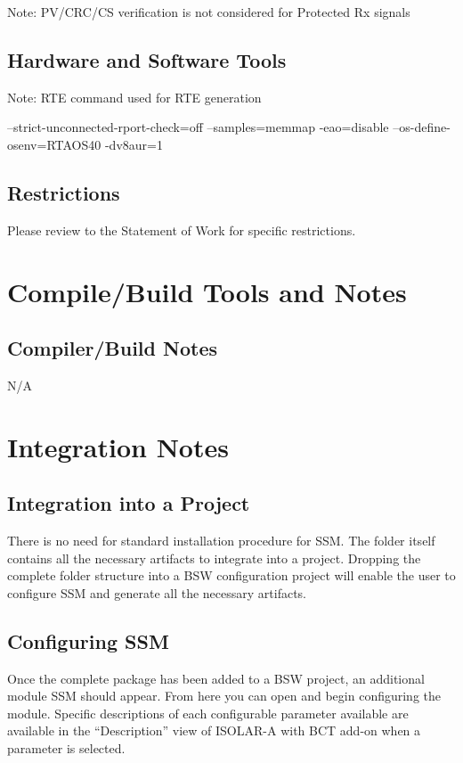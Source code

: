 

Note: PV/CRC/CS verification is not considered for Protected Rx signals

\subsection{Hardware and Software Tools}


Note: RTE command used for RTE generation

\begin{rtecommandline}
--strict-unconnected-rport-check=off --samples=memmap -eao=disable --os-define-osenv=RTAOS40 -dv8aur=1
\end{rtecommandline}

\subsection{Restrictions}
Please review to the Statement of Work for specific restrictions.

\section{Compile/Build Tools and Notes}

\subsection{Compiler/Build Notes}
N/A

\section{Integration Notes}

\subsection{Integration into a Project}
There is no need for standard installation procedure for SSM.
The folder itself contains all the necessary artifacts to integrate into a project.
Dropping the complete folder structure into a BSW configuration project will enable the user to configure SSM and generate all the necessary artifacts.

\subsection{Configuring SSM}
Once the complete package has been added to a BSW project, an additional module SSM should appear.
From here you can open and begin configuring the module.
Specific descriptions of each configurable parameter available are available in the “Description” view of ISOLAR-A with BCT add-on when a parameter is selected.

